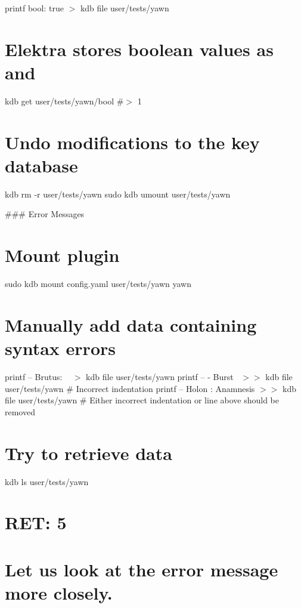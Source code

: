 printf \textquotesingle{}bool\+: true\textquotesingle{} $>$ {\ttfamily kdb file user/tests/yawn}

\section*{Elektra stores boolean values as {} and {}}

kdb get user/tests/yawn/bool \#$>$ 1

\section*{Undo modifications to the key database}

kdb rm -\/r user/tests/yawn sudo kdb umount user/tests/yawn 
\begin{DoxyCode}
### Error Messages
\end{DoxyCode}
 \section*{Mount plugin}

sudo kdb mount config.\+yaml user/tests/yawn yawn

\section*{Manually add data containing syntax errors}

printf -- \textquotesingle{}Brutus\+: ~\newline
\textquotesingle{} $>$ {\ttfamily kdb file user/tests/yawn} printf -- \textquotesingle{}-\/ Burst~\newline
\textquotesingle{} $>$$>$ {\ttfamily kdb file user/tests/yawn} \# Incorrect indentation printf -- \textquotesingle{} Holon \+: Anamnesis\textquotesingle{} $>$$>$ {\ttfamily kdb file user/tests/yawn} \# Either incorrect indentation or line above should be removed

\section*{Try to retrieve data}

kdb ls user/tests/yawn \section*{R\+ET\+: 5}

\section*{Let us look at the error message more closely.}

